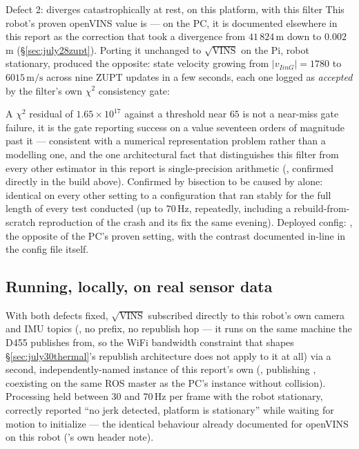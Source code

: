 \begin{casestudy}{Defect 2:  diverges catastrophically at rest, on this platform, with this filter}
This robot's proven openVINS value is  --- on the
PC, it is documented elsewhere in this report as the correction that
took a divergence from $41\,824$\,m down to $0.002$\,m
(\S\ref{sec:july28zupt}). Porting it unchanged to $\sqrt{\text{VINS}}$ on the Pi, robot
stationary, produced the opposite: state velocity growing from
$|v_{IinG}| = 1780$ to $6015\,\text{m/s}$ across nine ZUPT updates in a
few seconds, each one logged as \emph{accepted} by the filter's own
$\chi^2$ consistency gate:
\begin{center}
\end{center}
A $\chi^2$ residual of $1.65\times10^{17}$ against a threshold near
$65$ is not a near-miss gate failure, it is the gate reporting success
on a value seventeen orders of magnitude past it --- consistent with a
numerical representation problem rather than a modelling one, and the
one architectural fact that distinguishes this filter from every other
estimator in this report is single-precision arithmetic
(, confirmed directly in the build above).
Confirmed by bisection to be caused by  alone: identical
on every other setting to a configuration that ran stably for the full
length of every test conducted (up to $70\,\mathrm{Hz}$, repeatedly,
including a rebuild-from-scratch reproduction of the crash and its fix
the same evening). Deployed config: , the
opposite of the PC's proven setting, with the contrast documented
in-line in the config file itself.
\end{casestudy}

\subsection{Running, locally, on real sensor data}

With both defects fixed, $\sqrt{\text{VINS}}$ subscribed directly to
this robot's own camera and IMU topics
(, no 
prefix, no republish hop --- it runs on the same machine the D455
publishes from, so the WiFi bandwidth constraint that shapes
\S\ref{sec:july30thermal}'s republish architecture does not apply to
it at all) via a second, independently-named instance of this report's
own  (, publishing
, coexisting on the same ROS master as the
PC's instance without collision). Processing held between $30$ and
$70\,\mathrm{Hz}$ per frame with the robot stationary, correctly
reported ``no jerk detected, platform is stationary'' while waiting for
motion to initialize --- the identical behaviour already documented for
openVINS on this robot ('s own
header note).

